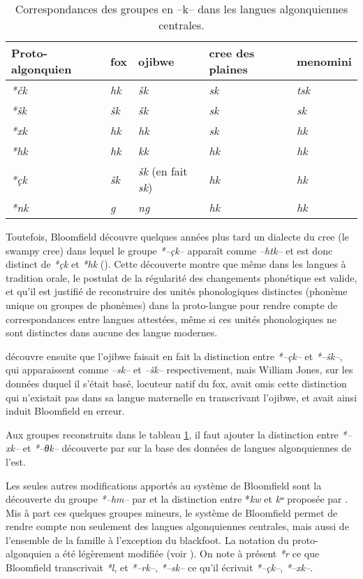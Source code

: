 \documentclass[twoside,a4paper,11pt]{article}
\newcommand{\ipa}[1]{{\phon\textit{#1}}}
\newcommand{\Σ}{\greek{Σ}}
\begin{document}
\begin{table}[h]
\caption{Correspondances des groupes en --k-- dans les langues algonquiennes centrales.} \centering  \label{tab:clusters.k}
\begin{tabular}{lllll}
\toprule
Proto-algonquien & fox & ojibwe & cree des plaines & menomini \\
\midrule
\ipa{*čk} & \ipa{hk} & \ipa{šk} & \ipa{sk} & \ipa{tsk} \\
\ipa{*šk} & \ipa{šk} & \ipa{šk} & \ipa{sk} & \ipa{sk} \\
\ipa{*xk} & \ipa{hk} & \ipa{hk} & \ipa{sk} & \ipa{hk} \\
\ipa{*hk} & \ipa{hk} & \ipa{kk} & \ipa{hk} & \ipa{hk} \\
\ipa{*çk} & \ipa{šk} & \ipa{šk} (en fait \ipa{sk}) & \ipa{hk} & \ipa{hk} \\
\ipa{*nk} & \ipa{g} & \ipa{ng} & \ipa{hk} & \ipa{hk} \\
\bottomrule
\end{tabular}
\end{table}

Toutefois, Bloomfield découvre quelques années plus tard un dialecte du cree (le swampy cree) dans lequel le groupe \ipa{*--çk--} apparaît comme \ipa{--htk--} et est donc distinct de \ipa{*çk}  et \ipa{*hk} (\citealt{bloomfield28thk}). Cette découverte montre que même dans les langues à tradition orale, le postulat de la régularité des changements phonétique est valide, et qu'il est justifié de reconstruire des unités phonologiques distinctes (phonème unique ou groupes de phonèmes) dans la proto-langue pour rendre compte de correspondances entre langues attestées, même si ces unités phonologiques ne sont distinctes dans aucune des langue modernes. 

\citet{bloomfield46proto} découvre ensuite que l'ojibwe faisait en fait la distinction entre  \ipa{*--çk--} et \ipa{*--šk--}, qui apparaissent comme \ipa{--sk--} et \ipa{--šk--} respectivement, mais William Jones, sur les données duquel il s'était basé, locuteur natif du fox, avait omis cette distinction qui n'existait pas dans sa langue maternelle en transcrivant l'ojibwe, et avait ainsi induit Bloomfield en erreur.

Aux groupes reconstruits dans le tableau \ref{tab:clusters.k}, il faut ajouter la distinction entre \ipa{*--xk--} et \ipa{*--θk--} découverte par \citet{siebert41clusters} sur la base des données de langues algonquiennes de l'est. 

Les seules autres modifications apportés au système de Bloomfield sont la découverte du groupe  \ipa{*--hm--} par \citet{goddard79comparative} et la distinction entre *\ipa{kw} et \ipa{kʷ} proposée par \citet{pentland79phd}. Mis à part ces quelques groupes mineurs, le système   de Bloomfield permet de rendre compte non seulement des langues algonquiennes centrales, mais aussi de l'ensemble de la famille à l'exception du blackfoot. La notation du proto-algonquien a été légèrement modifiée (voir \citealt{goddard98arapaho}). On note à présent \ipa{*r} ce que Bloomfield transcrivait \ipa{*l}, et \ipa{*--rk--},  \ipa{*--sk--} ce qu'il écrivait \ipa{*--çk--},  \ipa{*--xk--}.
\end{document}
